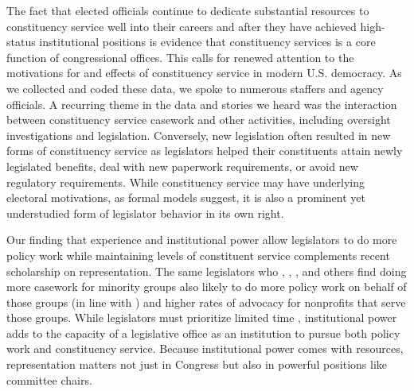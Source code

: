 \documentclass[12pt]{article}
\begin{document}
The fact that elected officials continue to dedicate substantial resources to constituency service well into their careers and after they have achieved high-status institutional positions is evidence that constituency services is a core function of congressional offices. This calls for renewed attention to the motivations for and effects of constituency service in modern U.S. democracy. As we collected and coded these data, we spoke to numerous staffers and agency officials. A recurring theme in the data and stories we heard was the interaction between constituency service casework and other activities, including oversight investigations and legislation. Conversely, new legislation often resulted in new forms of constituency service as legislators helped their constituents attain newly legislated benefits, deal with new paperwork requirements, or avoid new regulatory requirements. While constituency service may have underlying electoral motivations, as formal models suggest, it is also a prominent yet understudied form of legislator behavior in its own right. 

Our finding that experience and institutional power allow legislators to do more policy work while maintaining levels of constituent service complements recent scholarship on representation. The same legislators who \citet{Grose2011}, 
\citet{Dinesen2021}, 
\citet{LowandeRitchieLauterbach2018}, 
and others find doing more casework for minority groups also likely to do more policy work on behalf of those groups (in line with \citet{Mendez2018}) and higher rates of advocacy for nonprofits that serve those groups. While legislators must prioritize limited time \citep{Kaslovsky2022}, institutional power adds to the capacity of a legislative office as an institution to pursue both policy work and constituency service. Because institutional power comes with resources, representation matters not just in Congress but also in powerful positions like committee chairs. 

\end{document}
